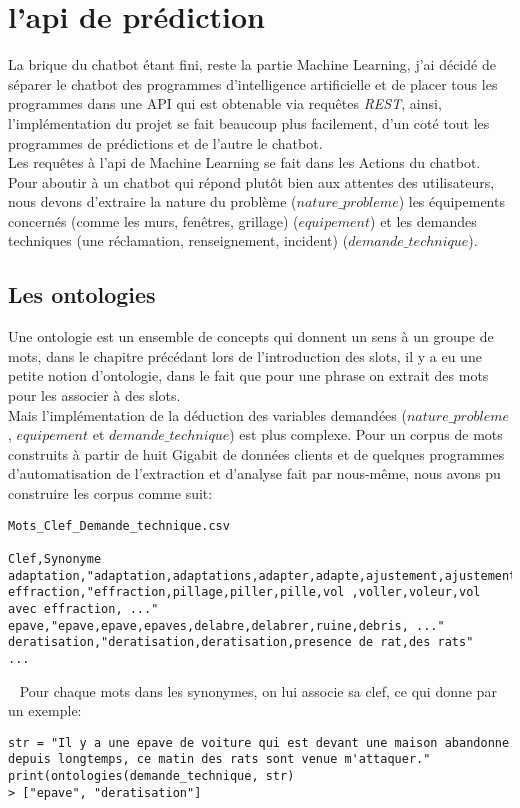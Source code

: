 \chapter{l'api de prédiction}
La brique du chatbot étant fini, reste la partie Machine Learning, j'ai décidé de séparer le chatbot des programmes d'intelligence artificielle et de placer tous les programmes dans une API qui est obtenable via requêtes \textit{REST}, ainsi, l'implémentation du projet se fait beaucoup plus facilement, d'un coté tout les programmes de prédictions et de l'autre le chatbot.\\
Les requêtes à l'api de Machine Learning se fait dans les Actions du chatbot.\\
\linebreak
Pour aboutir à un chatbot qui répond plutôt bien aux attentes des utilisateurs, nous devons d'extraire la nature du problème ($nature\_probleme$) les équipements concernés (comme les murs, fenêtres, grillage) ($equipement$) et les demandes techniques (une réclamation, renseignement, incident)  ($demande\_technique$).

\pagebreak
\section{Les ontologies}
Une ontologie est un ensemble de concepts qui donnent un sens à un groupe de mots, dans le chapitre précédant lors de l'introduction des slots, il y a eu une petite notion d'ontologie, dans le fait que pour une phrase on extrait des mots pour les associer à des slots.\\
Mais l'implémentation de la déduction des variables demandées ($nature\_probleme$, $equipement$ et $demande\_technique$) est plus complexe. Pour un corpus de mots construits à partir de huit Gigabit de données clients et de quelques programmes d'automatisation de l'extraction et d'analyse fait par nous-même, nous avons pu construire les corpus comme suit:
\ \linebreak
\begin{lstlisting}
Mots_Clef_Demande_technique.csv

Clef,Synonyme
adaptation,"adaptation,adaptations,adapter,adapte,ajustement,ajustements,ajuster,..."
effraction,"effraction,pillage,piller,pille,vol ,voller,voleur,vol avec effraction, ..."
epave,"epave,epave,epaves,delabre,delabrer,ruine,debris, ..."
deratisation,"deratisation,deratisation,presence de rat,des rats"
...
\end{lstlisting}
\ \linebreak
Pour chaque mots dans les synonymes, on lui associe sa clef, ce qui donne par un exemple:
\ \linebreak
\begin{lstlisting}
str = "Il y a une epave de voiture qui est devant une maison abandonne depuis longtemps, ce matin des rats sont venue m'attaquer."
print(ontologies(demande_technique, str)
> ["epave", "deratisation"]
\end{lstlisting}
\ \linebreak

